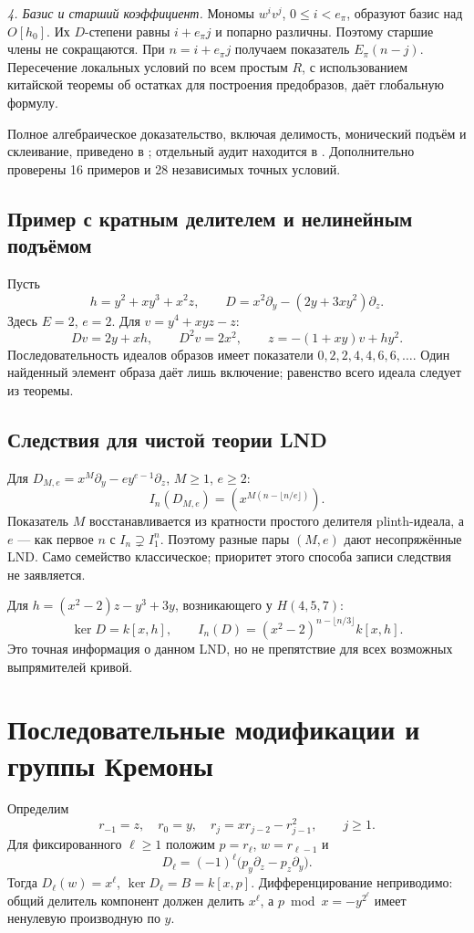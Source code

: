 \textit{4. Базис и старший коэффициент.} Мономы $w^iv^j$, $0\le i<e_\pi$, образуют базис над $O[h_0]$. Их $D$-степени равны $i+e_\pi j$ и попарно различны. Поэтому старшие члены не сокращаются. При $n=i+e_\pi j$ получаем показатель $E_\pi(n-j)$. Пересечение локальных условий по всем простым $R$, с использованием китайской теоремы об остатках для построения предобразов, даёт глобальную формулу.

Полное алгебраическое доказательство, включая делимость, монический подъём и склеивание, приведено в ; отдельный аудит находится в . Дополнительно проверены 16 примеров и 28 независимых точных условий.

\subsection*{Пример с кратным делителем и нелинейным подъёмом}
Пусть
\[
h=y^2+xy^3+x^2z,\qquad D=x^2\partial_y-(2y+3xy^2)\partial_z.
\]
Здесь $E=2$, $e=2$. Для $v=y^4+xyz-z$:
\[
Dv=2y+xh,\qquad D^2v=2x^2,\qquad
z=-(1+xy)v+hy^2.
\]
Последовательность идеалов образов имеет показатели $0,2,2,4,4,6,6,\ldots$. Один найденный элемент образа даёт лишь включение; равенство всего идеала следует из теоремы.

\subsection*{Следствия для чистой теории LND}
Для $D_{M,e}=x^M\partial_y-e y^{e-1}\partial_z$, $M\ge1$, $e\ge2$:
\[
I_n(D_{M,e})=(x^{M(n-\lfloor n/e\rfloor)}).
\]
Показатель $M$ восстанавливается из кратности простого делителя plinth-идеала, а $e$ --- как первое $n$ с $I_n\supsetneq I_1^n$. Поэтому разные пары $(M,e)$ дают несопряжённые LND. Само семейство классическое; приоритет этого способа записи следствия не заявляется.

Для $h=(x^2-2)z-y^3+3y$, возникающего у $H(4,5,7)$:
\[
\ker D=k[x,h],\qquad I_n(D)=(x^2-2)^{n-\lfloor n/3\rfloor}k[x,h].
\]
Это точная информация о данном LND, но не препятствие для всех возможных выпрямителей кривой.

\section{Последовательные модификации и группы Кремоны}\label{sec:iterated}
Определим
\[
r_{-1}=z,\quad r_0=y,\quad r_j=xr_{j-2}-r_{j-1}^2,\qquad j\ge1.
\]
Для фиксированного $\ell\ge1$ положим $p=r_\ell$, $w=r_{\ell-1}$ и
\[
D_\ell=(-1)^\ell\bigl(p_y\partial_z-p_z\partial_y\bigr).
\]
Тогда $D_\ell(w)=x^\ell$, $\ker D_\ell=B=k[x,p]$. Дифференцирование неприводимо: общий делитель компонент должен делить $x^\ell$, а $p\bmod x=-y^{2^\ell}$ имеет ненулевую производную по $y$.

